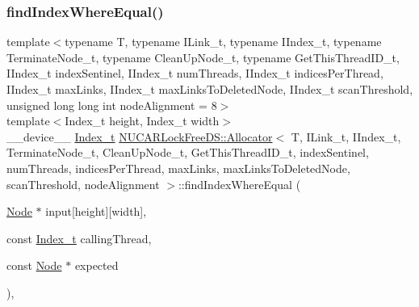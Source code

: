 \subsubsection{\texorpdfstring{find\+Index\+Where\+Equal()}{findIndexWhereEqual()}}
{\footnotesize\ttfamily template$<$typename T, typename I\+Link\+\_\+t, typename I\+Index\+\_\+t, typename Terminate\+Node\+\_\+t, typename Clean\+Up\+Node\+\_\+t, typename Get\+This\+Thread\+I\+D\+\_\+t, I\+Index\+\_\+t index\+Sentinel, I\+Index\+\_\+t num\+Threads, I\+Index\+\_\+t indices\+Per\+Thread, I\+Index\+\_\+t max\+Links, I\+Index\+\_\+t max\+Links\+To\+Deleted\+Node, I\+Index\+\_\+t scan\+Threshold, unsigned long long int node\+Alignment = 8$>$ \\
template$<$Index\+\_\+t height, Index\+\_\+t width$>$ \\
\+\_\+\+\_\+device\+\_\+\+\_\+ \mbox{\hyperlink{class_n_u_c_a_r_lock_free_d_s_1_1_allocator_a2776cca35e8343bf5007bd8b6f3a3f8f}{Index\+\_\+t}} \mbox{\hyperlink{class_n_u_c_a_r_lock_free_d_s_1_1_allocator}{N\+U\+C\+A\+R\+Lock\+Free\+D\+S\+::\+Allocator}}$<$ T, I\+Link\+\_\+t, I\+Index\+\_\+t, Terminate\+Node\+\_\+t, Clean\+Up\+Node\+\_\+t, Get\+This\+Thread\+I\+D\+\_\+t, index\+Sentinel, num\+Threads, indices\+Per\+Thread, max\+Links, max\+Links\+To\+Deleted\+Node, scan\+Threshold, node\+Alignment $>$\+::find\+Index\+Where\+Equal (\begin{DoxyParamCaption}\item[{\mbox{\hyperlink{class_n_u_c_a_r_lock_free_d_s_1_1_allocator_1_1_node}{Node}} $\ast$}]{input\mbox{[}height\mbox{]}\mbox{[}width\mbox{]},  }\item[{const \mbox{\hyperlink{class_n_u_c_a_r_lock_free_d_s_1_1_allocator_a2776cca35e8343bf5007bd8b6f3a3f8f}{Index\+\_\+t}}}]{calling\+Thread,  }\item[{const \mbox{\hyperlink{class_n_u_c_a_r_lock_free_d_s_1_1_allocator_1_1_node}{Node}} $\ast$}]{expected }\end{DoxyParamCaption})\hspace{0.3cm}{\ttfamily [inline]}, {\ttfamily [private]}}

\mbox{\label{class_n_u_c_a_r_lock_free_d_s_1_1_allocator_a4749c1ddff91fcdff56e750545a6790a}} 
